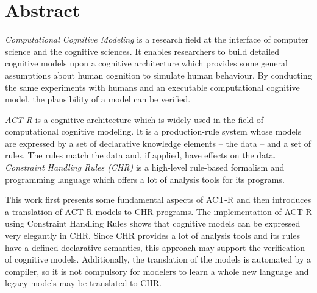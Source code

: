 \chapter*{Abstract}

\emph{Computational Cognitive Modeling} is a research field at the interface of computer science and the cognitive sciences. It enables researchers to build detailed cognitive models upon a cognitive architecture which provides some general assumptions about human cognition to simulate human behaviour. By conducting the same experiments with humans and an executable computational cognitive model, the plausibility of a model can be verified.

\emph{ACT-R} is a cognitive architecture which is widely used in the field of computational cognitive modeling. It is a production-rule system whose models are expressed by a set of declarative knowledge elements -- the data -- and a set of rules. The rules match the data and, if applied, have effects on the data. \emph{Constraint Handling Rules (CHR)} is a high-level rule-based formalism and programming language which offers a lot of analysis tools for its programs. 

This work first presents some fundamental aspects of ACT-R and then introduces a translation of ACT-R models to CHR programs. The implementation of ACT-R using Constraint Handling Rules shows that cognitive models can be expressed very elegantly in CHR. Since CHR provides a lot of analysis tools and its rules have a defined declarative semantics, this approach may support the verification of cognitive models. Additionally, the translation of the models is automated by a compiler, so it is not compulsory for modelers to learn a whole new language and legacy models may be translated to CHR.